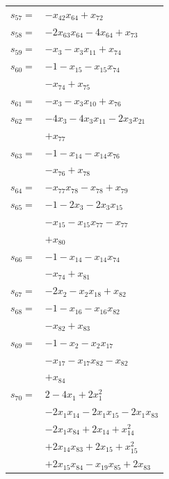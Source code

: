 \begin{longtable}{@{}r@{\;}l@{}}
\(s_{57}=\) & \(\displaystyle -x_{42}x_{64} +x_{72}\) \\[3pt]
\(s_{58}=\) & \(\displaystyle -2x_{63}x_{64} -4x_{64} +x_{73}\) \\[3pt]
\(s_{59}=\) & \(\displaystyle -x_{3} -x_{3}x_{11} +x_{74}\) \\[3pt]
\(s_{60}=\) & \(\displaystyle -1 -x_{15} -x_{15}x_{74}\) \\
 & \(\displaystyle -x_{74} +x_{75}\) \\[3pt]
\(s_{61}=\) & \(\displaystyle -x_{3} -x_{3}x_{10} +x_{76}\) \\[3pt]
\(s_{62}=\) & \(\displaystyle -4x_{3} -4x_{3}x_{11} -2x_{3}x_{21}\) \\
 & \(\displaystyle +x_{77}\) \\[3pt]
\(s_{63}=\) & \(\displaystyle -1 -x_{14} -x_{14}x_{76}\) \\
 & \(\displaystyle -x_{76} +x_{78}\) \\[3pt]
\(s_{64}=\) & \(\displaystyle -x_{77}x_{78} -x_{78} +x_{79}\) \\[3pt]
\(s_{65}=\) & \(\displaystyle -1 -2x_{3} -2x_{3}x_{15}\) \\
 & \(\displaystyle -x_{15} -x_{15}x_{77} -x_{77}\) \\
 & \(\displaystyle +x_{80}\) \\[3pt]
\(s_{66}=\) & \(\displaystyle -1 -x_{14} -x_{14}x_{74}\) \\
 & \(\displaystyle -x_{74} +x_{81}\) \\[3pt]
\(s_{67}=\) & \(\displaystyle -2x_{2} -x_{2}x_{18} +x_{82}\) \\[3pt]
\(s_{68}=\) & \(\displaystyle -1 -x_{16} -x_{16}x_{82}\) \\
 & \(\displaystyle -x_{82} +x_{83}\) \\[3pt]
\(s_{69}=\) & \(\displaystyle -1 -x_{2} -x_{2}x_{17}\) \\
 & \(\displaystyle -x_{17} -x_{17}x_{82} -x_{82}\) \\
 & \(\displaystyle +x_{84}\) \\[3pt]
\(s_{70}=\) & \(\displaystyle 2 -4x_{1} +2x_{1}^{2}\) \\
 & \(\displaystyle -2x_{1}x_{14} -2x_{1}x_{15} -2x_{1}x_{83}\) \\
 & \(\displaystyle -2x_{1}x_{84} +2x_{14} +x_{14}^{2}\) \\
 & \(\displaystyle +2x_{14}x_{83} +2x_{15} +x_{15}^{2}\) \\
 & \(\displaystyle +2x_{15}x_{84} -x_{19}x_{85} +2x_{83}\) \\

\end{longtable}
